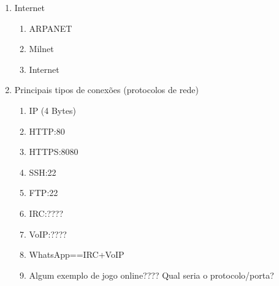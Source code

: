 \begin{enumerate}
	\item Internet
	\begin{enumerate}
		\item ARPANET
		\item Milnet
		\item Internet
	\end{enumerate}
	\item Principais tipos de conexões (protocolos de rede)
	\begin{enumerate}
		\item IP (4 Bytes)
		\item HTTP:80
		\item HTTPS:8080
		\item SSH:22
		\item FTP:22
		\item IRC:????
		\item VoIP:????
		\item WhatsApp==IRC+VoIP
		\item Algum exemplo de jogo online???? Qual seria o protocolo/porta?
	\end{enumerate}
\end{enumerate}
